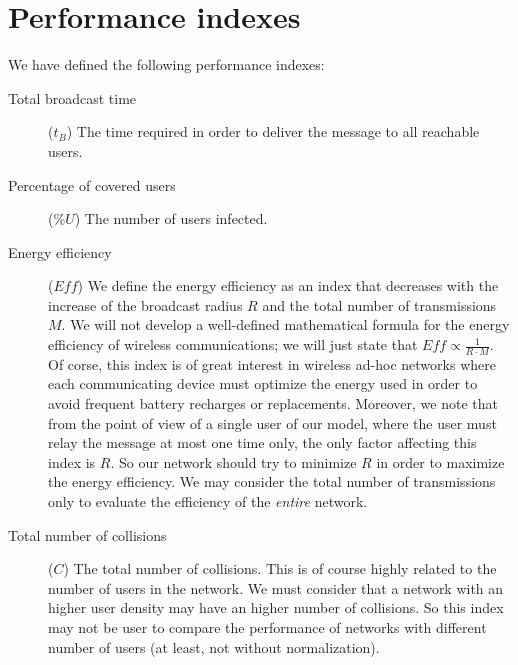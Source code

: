 \section{Performance indexes}\label{sec:indexes}

We have defined the following performance indexes:
\begin{description}
	\item[Total broadcast time] (\(t_B\)) The time required in order to
		deliver the message to all reachable users.
	\item[Percentage of covered users] (\(\mathit{\%U}\)) The number of
		users infected.
	\item[Energy efficiency] (\(\mathit{Eff}\)) We define the energy
		efficiency as an index that decreases with the increase of the
		broadcast radius \(R\) and the total number of transmissions
		\(M\). We will not develop a well-defined mathematical formula
		for the energy efficiency of wireless communications; we will
		just state that \(\mathit{Eff} \propto \frac{1}{R \cdot M}\). Of
		corse, this index is of great interest in wireless ad-hoc
		networks where each communicating device must optimize the
		energy used in order to avoid frequent battery recharges or
		replacements. Moreover, we note that from the point of view of a
		single user of our model, where the user must relay the message
		at most one time only, the only factor affecting this index is
		\(R\). So our network should try to minimize \(R\) in order to
		maximize the energy efficiency. We may consider the total number
		of transmissions only to evaluate the efficiency of the
		\emph{entire} network.
	\item[Total number of collisions] (\(C\)) The total number of
		collisions. This is of course highly related to the number of
		users in the network. We must consider that a network with an
		higher user density may have an higher number of collisions. So
		this index may not be user to compare the performance of
		networks with different number of users (at least, not without
		normalization).
\end{description}
